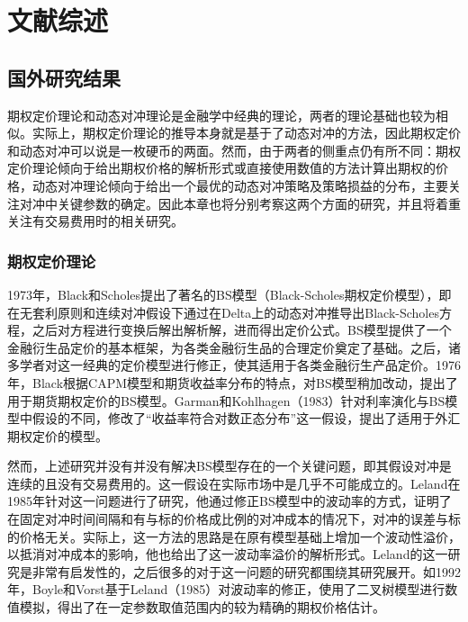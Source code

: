 
\chapter{文献综述}
\label{chap:bib}

\section{国外研究结果}

期权定价理论和动态对冲理论是金融学中经典的理论，两者的理论基础也较为相似。实际上，期权定价理论的推导本身就是基于了动态对冲的方法，因此期权定价和动态对冲可以说是一枚硬币的两面。然而，由于两者的侧重点仍有所不同：期权定价理论倾向于给出期权价格的解析形式或直接使用数值的方法计算出期权的价格，动态对冲理论倾向于给出一个最优的动态对冲策略及策略损益的分布，主要关注对冲中关键参数的确定。因此本章也将分别考察这两个方面的研究，并且将着重关注有交易费用时的相关研究。

\subsection{期权定价理论}

1973年，Black和Scholes提出了著名的BS模型（Black-Scholes期权定价模型），即在无套利原则和连续对冲假设下通过在Delta上的动态对冲推导出Black-Scholes方程，之后对方程进行变换后解出解析解，进而得出定价公式。BS模型提供了一个金融衍生品定价的基本框架，为各类金融衍生品的合理定价奠定了基础。之后，诸多学者对这一经典的定价模型进行修正，使其适用于各类金融衍生产品定价。1976年，Black根据CAPM模型和期货收益率分布的特点，对BS模型稍加改动，提出了用于期货期权定价的BS模型。Garman和Kohlhagen（1983）针对利率演化与BS模型中假设的不同，修改了“收益率符合对数正态分布”这一假设，提出了适用于外汇期权定价的模型。

然而，上述研究并没有并没有解决BS模型存在的一个关键问题，即其假设对冲是连续的且没有交易费用的。这一假设在实际市场中是几乎不可能成立的。Leland在1985年针对这一问题进行了研究，他通过修正BS模型中的波动率的方式，证明了在固定对冲时间间隔和有与标的价格成比例的对冲成本的情况下，对冲的误差与标的价格无关。实际上，这一方法的思路是在原有模型基础上增加一个波动性溢价，以抵消对冲成本的影响，他也给出了这一波动率溢价的解析形式。Leland的这一研究是非常有启发性的，之后很多的对于这一问题的研究都围绕其研究展开。如1992年，Boyle和Vorst基于Leland（1985）对波动率的修正，使用了二叉树模型进行数值模拟，得出了在一定参数取值范围内的较为精确的期权价格估计。

